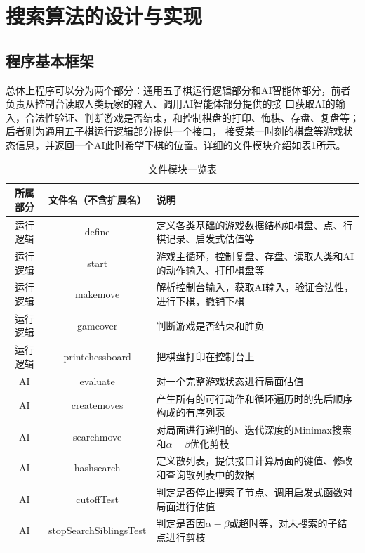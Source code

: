 \documentclass{acm_proc_article-sp}
\begin{document}
\section{\textbf{搜索算法的设计与实现}}

\subsection{\textbf{程序基本框架}}
总体上程序可以分为两个部分：通用五子棋运行逻辑部分和AI智能体部分，前者负责从控制台读取人类玩家的输入、调用AI智能体部分提供的接
口获取AI的输入，合法性验证、判断游戏是否结束，和控制棋盘的打印、悔棋、存盘、复盘等；后者则为通用五子棋运行逻辑部分提供一个接口，
接受某一时刻的棋盘等游戏状态信息，并返回一个AI此时希望下棋的位置。详细的文件模块介绍如表1所示。\\
\begin{table}
        \small
       \centering
       \caption{文件模块一览表}
       \begin{tabular}{|c|c|l|} \hline
       所属部分 & 文件名（不含扩展名） & 说明\\ \hline
       运行逻辑 & define & 定义各类基础的游戏数据结构如棋盘、点、行棋记录、启发式估值等\\ \hline
       运行逻辑 & start & 游戏主循环，控制复盘、存盘、读取人类和AI的动作输入、打印棋盘等\\ \hline
       运行逻辑 & makemove & 解析控制台输入，获取AI输入，验证合法性，进行下棋，撤销下棋\\ \hline
       运行逻辑 & gameover & 判断游戏是否结束和胜负\\ \hline
       运行逻辑 & printchessboard & 把棋盘打印在控制台上\\ \hline
       AI & evaluate & 对一个完整游戏状态进行局面估值\\ \hline
       AI & createmoves & 产生所有的可行动作和循环遍历时的先后顺序构成的有序列表\\ \hline
       AI & searchmove & 对局面进行递归的、迭代深度的Minimax搜索和$\alpha-\beta$优化剪枝\\ \hline
       AI & hashsearch & 定义散列表，提供接口计算局面的键值、修改和查询散列表中的数据\\ \hline
       AI & cutoffTest & 判定是否停止搜索子节点、调用启发式函数对局面进行估值\\ \hline
       AI & stopSearchSiblingsTest & 判定是否因$\alpha-\beta$或超时等，对未搜索的子结点进行剪枝\\ \hline
       \end{tabular}
\end{table}
\end{document}
